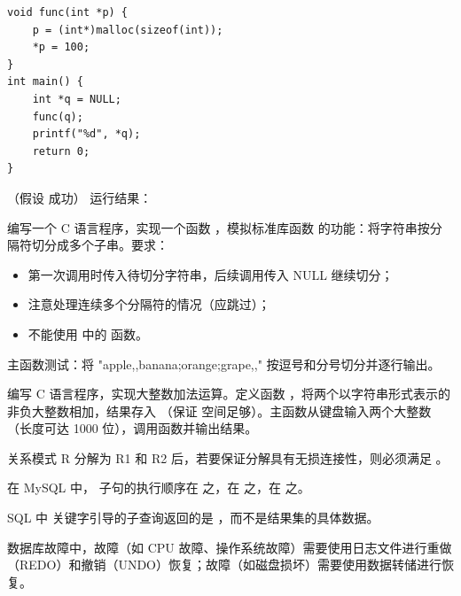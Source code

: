 \documentclass[a4paper,11pt]{article}
\begin{document}
\q
\begin{lstlisting}[language={[custom]C}]
void func(int *p) {
    p = (int*)malloc(sizeof(int));
    *p = 100;
}
int main() {
    int *q = NULL;
    func(q);
    printf("%d", *q);
    return 0;
}
\end{lstlisting}
（假设  成功）
运行结果：\underline{\hspace{3cm}}


\pq 编写一个 C 语言程序，实现一个函数 ，模拟标准库函数  的功能：将字符串按分隔符切分成多个子串。要求：
\begin{itemize}
  \item 第一次调用时传入待切分字符串，后续调用传入 NULL 继续切分；
  \item 注意处理连续多个分隔符的情况（应跳过）；
  \item 不能使用  中的  函数。
\end{itemize}
主函数测试：将 "apple,,banana;orange;grape,," 按逗号和分号切分并逐行输出。

\anslines{5cm}

\pq 编写 C 语言程序，实现大整数加法运算。定义函数 ，将两个以字符串形式表示的非负大整数相加，结果存入 （保证  空间足够）。主函数从键盘输入两个大整数（长度可达 1000 位），调用函数并输出结果。

\anslines{5.5cm}



\q 关系模式 R 分解为 R1 和 R2 后，若要保证分解具有无损连接性，则必须满足 \fillblank 。

\q 在 MySQL 中， 子句的执行顺序在  之\fillblank ，在  之\fillblank ，在  之\fillblank 。

\q SQL 中  关键字引导的子查询返回的是 \fillblank ，而不是结果集的具体数据。

\q 数据库故障中，\fillblank 故障（如 CPU 故障、操作系统故障）需要使用日志文件进行重做（REDO）和撤销（UNDO）恢复；\fillblank 故障（如磁盘损坏）需要使用数据转储进行恢复。
\end{document}
